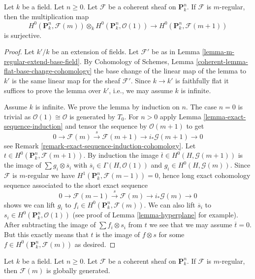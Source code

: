 \begin{lemma}
\label{lemma-m-regular-multiply}
Let $k$ be a field. Let $n \geq 0$.
Let $\mathcal{F}$ be a coherent sheaf on $\mathbf{P}^n_k$.
If $\mathcal{F}$ is $m$-regular, then the multiplication map
$$
H^0(\mathbf{P}^n_k, \mathcal{F}(m)) \otimes_k
H^0(\mathbf{P}^n_k, \mathcal{O}(1))
\longrightarrow
H^0(\mathbf{P}^n_k, \mathcal{F}(m + 1))
$$
is surjective.
\end{lemma}

\begin{proof}
Let $k'/k$ be an extension of fields. Let $\mathcal{F}'$
be as in Lemma \ref{lemma-m-regular-extend-base-field}. By
Cohomology of Schemes, Lemma \ref{coherent-lemma-flat-base-change-cohomology}
the base change of the linear map of the lemma to $k'$ is the
same linear map for the sheaf $\mathcal{F}'$. Since $k \to k'$
is faithfully flat it suffices to prove the lemma over $k'$, i.e.,
we may assume $k$ is infinite.

\medskip\noindent
Assume $k$ is infinite. We prove the lemma by induction on $n$.
The case $n = 0$ is trivial as $\mathcal{O}(1) \cong \mathcal{O}$
is generated by $T_0$. For $n > 0$ apply
Lemma \ref{lemma-exact-sequence-induction}
and tensor the sequence by $\mathcal{O}(m + 1)$ to get
$$
0 \to \mathcal{F}(m) \xrightarrow{s} \mathcal{F}(m + 1) \to
i_*\mathcal{G}(m + 1) \to 0
$$
see Remark \ref{remark-exact-sequence-induction-cohomology}.
Let $t \in H^0(\mathbf{P}^n_k, \mathcal{F}(m + 1))$.
By induction the image $\overline{t} \in H^0(H, \mathcal{G}(m + 1))$
is the image of $\sum g_i \otimes \overline{s}_i$ with
$\overline{s}_i \in \Gamma(H, \mathcal{O}(1))$ and
$g_i \in H^0(H, \mathcal{G}(m))$. Since $\mathcal{F}$ is $m$-regular
we have $H^1(\mathbf{P}^n_k, \mathcal{F}(m - 1)) = 0$, hence long
exact cohomology sequence associated to the short exact sequence
$$
0 \to \mathcal{F}(m - 1) \xrightarrow{s} \mathcal{F}(m) \to
i_*\mathcal{G}(m) \to 0
$$
shows we can lift $g_i$ to $f_i \in H^0(\mathbf{P}^n_k, \mathcal{F}(m))$.
We can also lift $\overline{s}_i$ to
$s_i \in H^0(\mathbf{P}^n_k, \mathcal{O}(1))$ (see proof of
Lemma \ref{lemma-hyperplane} for example). After subtracting the
image of $\sum f_i \otimes s_i$ from $t$ we see that we may assume
$\overline{t} = 0$. But this exactly means that $t$ is the
image of $f \otimes s$ for some $f \in H^0(\mathbf{P}^n_k, \mathcal{F}(m))$
as desired.
\end{proof}

\begin{lemma}
\label{lemma-m-regular-globally-generated}
Let $k$ be a field. Let $n \geq 0$.
Let $\mathcal{F}$ be a coherent sheaf on $\mathbf{P}^n_k$.
If $\mathcal{F}$ is $m$-regular, then $\mathcal{F}(m)$ is
globally generated.
\end{lemma}

